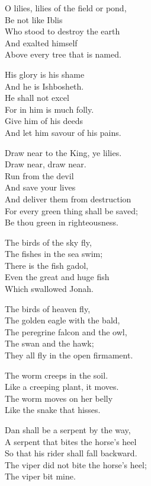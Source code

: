 \documentclass[
]{book}
\begin{document}
O lilies, lilies of the field or pond,\\
Be not like Iblis\\
Who stood to destroy the earth\\
And exalted himself\\
Above every tree that is named.

His glory is his shame\\
And he is Ishbosheth.\\
He shall not excel\\
For in him is much folly.\\
Give him of his deeds\\
And let him savour of his pains.

Draw near to the King, ye lilies.\\
Draw near, draw near.\\
Run from the devil\\
And save your lives\\
And deliver them from destruction\\
For every green thing shall be saved;\\
Be thou green in righteousness.

The birds of the sky fly,\\
The fishes in the sea swim;\\
There is the fish gadol,\\
Even the great and huge fish\\
Which swallowed Jonah.

The birds of heaven fly,\\
The golden eagle with the bald,\\
The peregrine falcon and the owl,\\
The swan and the hawk;\\
They all fly in the open firmament.

The worm creeps in the soil.\\
Like a creeping plant, it moves.\\
The worm moves on her belly\\
Like the snake that hisses.

Dan shall be a serpent by the way,\\
A serpent that bites the horse's heel\\
So that his rider shall fall backward.\\
The viper did not bite the horse's heel;\\
The viper bit mine.
\end{document}
